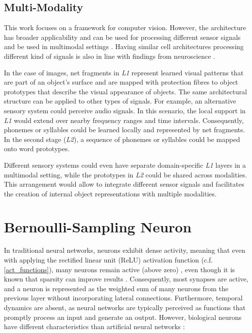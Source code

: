 \subsection{Multi-Modality}
This work focuses on a framework for computer vision. However, the architecture has broader applicability and can be used for processing different sensor signals and be used in multimodal settings \cite{ngiam_multimodal_2011, liu_learn_2018, baltrusaitis_multimodal_2019}.
Having similar cell architectures processing different kind of signals is also in line with findings from neuroscience .

In the case of images, net fragments in \emph{L1} represent learned visual patterns that are part of an object's surface and are mapped with protection fibres to object prototypes that describe the visual appearance of objects. 
The same architectural structure can be applied to other types of signals. For example, an alternative sensory system could perceive audio signals. In this scenario, the local support in \emph{L1} would extend over nearby frequency ranges and time intervals. Consequently, phonemes or syllables could be learned locally and represented by net fragments. In the second stage (\emph{L2}), a sequence of phonemes or syllables could be mapped onto word prototypes.

Different sensory systems could even have separate domain-specific \emph{L1} layers in a multimodal setting, while the prototypes in \emph{L2} could be shared across modalities. This arrangement would allow to integrate different sensor signals and facilitates the creation of internal object representations with multiple modalities.


\section{Bernoulli-Sampling Neuron}
In traditional neural networks, neurons exhibit dense activity, meaning that even with applying the rectified linear unit (ReLU) activation function (c.f. \eqref{act_functions}), many neurons remain active (above zero) , even though it is known that sparsity can improve results . Consequently, most synapses are active, and a neuron is represented as the weighted sum of many neurons from the previous layer without incorporating lateral connections. Furthermore, temporal dynamics are absent, as neural networks are typically perceived as functions that promptly process an input and generate an output. However, biological neurons have different characteristics than artificial neural networks :

